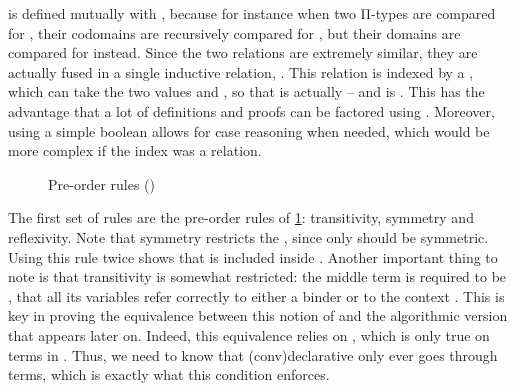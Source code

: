 is defined mutually with , because for instance when two Π-types
are compared for , their codomains are recursively compared for ,
but their domains are compared for  instead.%
Since the two relations are extremely similar, they are actually fused in a single
inductive relation, .
\AP This relation is indexed by a  , which can take
the two values  and , so that 
is actually  – and  is
. This has the advantage that a lot of definitions and proofs
can be factored using .
Moreover, using a simple boolean allows for case reasoning
when needed, which would be more complex if the index was \eg a relation.%

\begin{figure}[h]
  \ContinuedFloat*
  \caption{Pre-order rules ()}
  \label{fig:meta-cumul-struct}
\end{figure}

\AP The first set of rules are the pre-order rules of \cref{fig:meta-cumul-struct}:
transitivity, symmetry and reflexivity. Note that symmetry restricts the ,
since only  should be symmetric. Using this rule twice shows that 
 is included inside .
Another important thing to note is that transitivity is somewhat restricted:
the middle term is required to be ,%
\ie that all its variables refer correctly
to either a binder or to the context .
This is key in proving the equivalence between this notion of  and the
algorithmic version that appears later on. Indeed, this equivalence relies on ,
which is only true on  terms in . Thus, we need to know that
\kl(conv){declarative}  only ever goes through  terms,
which is exactly what this condition enforces.

